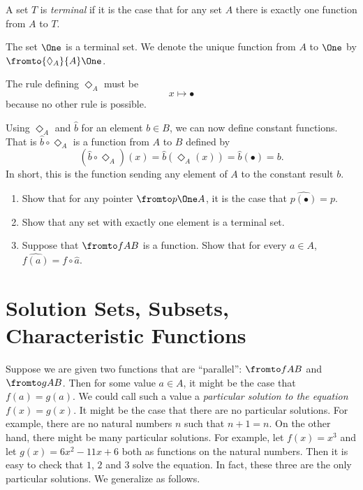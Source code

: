 \begin{defn}
	A set $T$ is \emph{terminal} if it is the case that for any set $A$ there is exactly one function from $A$ to $T$.
\end{defn}

\begin{axiom}
	The set $\One$ is a terminal set. 
	We denote the unique function from $A$ to $\One$ by $\fromto {\Diamond_A}{A}\One$.
\end{axiom} 

The rule defining $\Diamond_A$ must be
	\[x\mapsto\bullet\]
because no other rule is possible. 

Using $\Diamond_A$ and $\hat{b}$ for an element $b\in B$, we can now define constant functions. 
That is $\hat{b}\circ\Diamond_A$ is a function from $A$ to $B$ defined by 
\[(\hat{b}\circ\Diamond_A)(x) = \hat{b}(\Diamond_A(x))= \hat{b}(\bullet) = b.\] 
In short, this is the function sending any element of $A$ to the constant result $b$. 

\begin{exercises}
	\begin{enumerate}
		\item Show that for any pointer $\fromto p\One A$, it is the case that $\widehat{p(\bullet)}=p$.
		\item Show that any set with exactly one element is a terminal set.
		\item Suppose that $\fromto fAB$ is a function. Show that for every $a\in A$, $\widehat{f(a)} = f\circ \hat{a}$.
	\end{enumerate}
\end{exercises}

\section{Solution Sets, Subsets, Characteristic Functions}

Suppose we are given two functions that are ``parallel'': $\fromto fAB$ and $\fromto gAB$.
Then for some value $a\in A$, it might be the case that $f(a)=g(a)$.
We could call such a value a \emph{particular solution to the equation $f(x)=g(x)$}. 
It might be the case that there are no particular solutions.
For example, there are no natural numbers $n$ such that $n+1 = n$. 
On the other hand, there might be many particular solutions. 
For example, let $f(x)=x^3$ and let $g(x)= 6x^2 - 11x + 6$ both as functions on the natural numbers.
Then it is easy to check that $1$, $2$ and $3$ solve the equation.
In fact, these three are the only particular solutions.
We generalize as follows.

